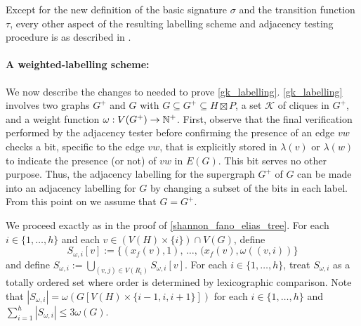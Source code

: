 \documentclass{patmorin}
\renewcommand{\le}{\leqslant}
\begin{document}
  Except for the new definition of the basic signature $\sigma$ and the transition function $\tau$, every other aspect of the resulting labelling scheme and adjacency testing procedure is as described in \cite{dujmovic.esperet.ea:adjacency}.

  \paragraph{A weighted-labelling scheme:}
  We now describe the changes to \cite{gawrychowski.janczewski:simpler,dujmovic.esperet.ea:adjacency} needed to prove \cref{gk_labelling}.
  \cref{gk_labelling} involves two graphs $G^+$ and $G$ with $G\subseteq G^+\subseteq H\boxtimes P$, a set $\mathcal{K}$ of cliques in $G^+$, and a weight function $\omega:V(G^+)\to\mathbb{N}^+$.
  First, observe that the final verification performed by the adjacency tester before confirming the presence of an edge $vw$ checks a bit, specific to the edge $vw$, that is explicitly stored in $\lambda(v)$ or $\lambda(w)$ to indicate the presence (or not) of $vw$ in $E(G)$.
  This bit serves no other purpose.  Thus, the adjacency labelling for the supergraph $G^+$ of $G$ can be made into an adjacency labelling for $G$ by changing a subset of the bits in each label.
  From this point on we assume that $G=G^+$.

  We proceed exactly as in the proof of \cref{shannon_fano_elias_tree}.
  For each $i\in\{1,\ldots,h\}$ and each $v\in (V(H)\times\{i\})\cap V(G)$, define
  \[
     S_{\omega,i}[v]:=\{(x_f(v),1),\,\ldots,\, (x_f(v),\omega((v,i))\}
  \]
  and define $S_{\omega,i}:=\bigcup_{(v,j)\in V(R_i)}S_{\omega,i}[v]$.  For each $i\in\{1,\ldots,h\}$, treat $S_{\omega,i}$ as a totally ordered set where order is determined by lexicographic comparison.  Note that $|S_{\omega,i}|=\omega(G[V(H)\times\{i-1,i,i+1\}])$ for each $i\in\{1,\ldots,h\}$ and $\sum_{i=1}^h |S_{\omega,i}|\le 3\omega(G)$.
\end{document}
